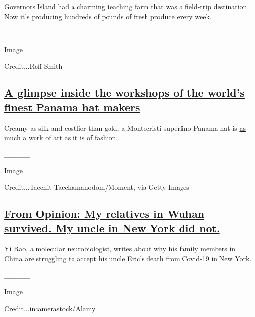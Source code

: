 Governors Island had a charming teaching farm that was a field-trip
destination. Now it's
\href{https://www.nytimes3xbfgragh.onion/2020/07/23/nyregion/governors-island-nyc-urban-farm.html}{producing
hundreds of pounds of fresh produce} every week.

\emph{\_\_\_\_\_}

Image

Credit...Roff Smith

\hypertarget{a-glimpse-inside-the-workshops-of-the-worlds-finest-panama-hat-makers}{%
\subsection{\texorpdfstring{\href{https://www.nytimes3xbfgragh.onion/2020/07/20/travel/panama-hats-ecuador.html}{A
glimpse inside the workshops of the world's finest Panama hat
makers}}{A glimpse inside the workshops of the world's finest Panama hat makers}}\label{a-glimpse-inside-the-workshops-of-the-worlds-finest-panama-hat-makers}}

Creamy as silk and costlier than gold, a Montecristi superfino Panama
hat is
\href{https://www.nytimes3xbfgragh.onion/2020/07/20/travel/panama-hats-ecuador.html}{as
much a work of art as it is of fashion}.

\emph{\_\_\_\_\_}

Image

Credit...Taechit Taechamanodom/Moment, via Getty Images

\hypertarget{from-opinion-my-relatives-in-wuhan-survived-my-uncle-in-new-york-did-not}{%
\subsection{\texorpdfstring{\href{https://www.nytimes3xbfgragh.onion/2020/07/22/opinion/coronavirus-china-us.html}{From
Opinion: My relatives in Wuhan survived. My uncle in New York did
not.}}{From Opinion: My relatives in Wuhan survived. My uncle in New York did not.}}\label{from-opinion-my-relatives-in-wuhan-survived-my-uncle-in-new-york-did-not}}

Yi Rao, a molecular neurobiologist, writes about
\href{https://www.nytimes3xbfgragh.onion/2020/07/22/opinion/coronavirus-china-us.html}{why
his family members in China are struggling to accept his uncle Eric's
death from Covid-19} in New York.

\emph{\_\_\_\_\_}

Image

Credit...incamerastock/Alamy

